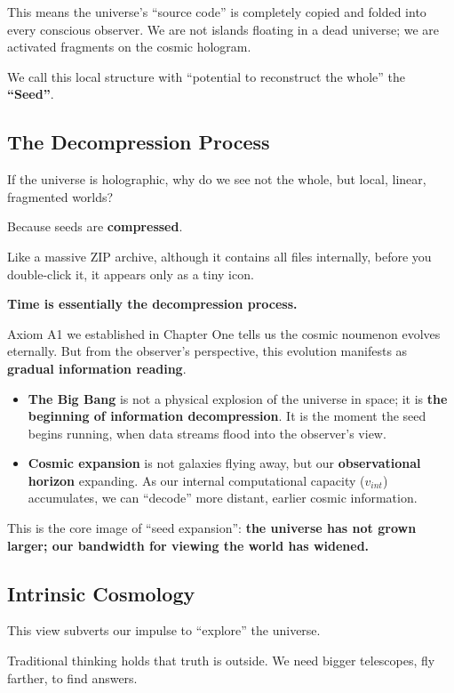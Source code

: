 This means the universe's ``source code'' is completely copied and folded into every conscious observer. We are not islands floating in a dead universe; we are activated fragments on the cosmic hologram.

We call this local structure with ``potential to reconstruct the whole'' the \textbf{``Seed''}.

\subsection{The Decompression Process}

If the universe is holographic, why do we see not the whole, but local, linear, fragmented worlds?

Because seeds are \textbf{compressed}.

Like a massive ZIP archive, although it contains all files internally, before you double-click it, it appears only as a tiny icon.

\textbf{Time is essentially the decompression process.}

Axiom A1 we established in Chapter One tells us the cosmic noumenon evolves eternally. But from the observer's perspective, this evolution manifests as \textbf{gradual information reading}.

\begin{itemize}
\item \textbf{The Big Bang} is not a physical explosion of the universe in space; it is \textbf{the beginning of information decompression}. It is the moment the seed begins running, when data streams flood into the observer's view.

\item \textbf{Cosmic expansion} is not galaxies flying away, but our \textbf{observational horizon} expanding. As our internal computational capacity ($v_{int}$) accumulates, we can ``decode'' more distant, earlier cosmic information.
\end{itemize}

This is the core image of ``seed expansion'': \textbf{the universe has not grown larger; our bandwidth for viewing the world has widened.}

\subsection{Intrinsic Cosmology}

This view subverts our impulse to ``explore'' the universe.

Traditional thinking holds that truth is outside. We need bigger telescopes, fly farther, to find answers.

